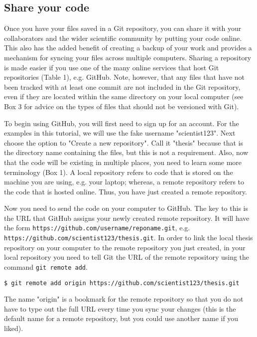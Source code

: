 \subsection{Share your code}

Once you have your files saved in a Git repository, you can share it with your collaborators and the wider scientific community by putting your code online.
This also has the added benefit of creating a backup of your work and provides a mechanism for syncing your files across multiple computers.
Sharing a repository is made easier if you use one of the many online services that host Git repositories (Table 1), e.g. GitHub.
Note, however, that any files that have not been tracked with at least one commit are not included in the Git repository, even if they are located within the same directory on your local computer (see Box 3 for advice on the types of files that should not be versioned with Git).

To begin using GitHub, you will first need to sign up for an account.
For the examples in this tutorial, we will use the fake username "scientist123".
Next choose the option to "Create a new repository".
Call it "thesis" because that is the directory name containing the files, but this is not a requirement.
Also, now that the code will be existing in multiple places, you need to learn some more terminology (Box 1).
A local repository refers to code that is stored on the machine you are using, e.g. your laptop; whereas, a remote repository refers to the code that is hosted online.
Thus, you have just created a remote repository.

Now you need to send the code on your computer to GitHub.
The key to this is the URL that GitHub assigns your newly created remote repository.
It will have the form \verb|https://github.com/username/reponame.git|, e.g. \verb|https://github.com/scientist123/thesis.git|.
In order to link the local thesis repository on your computer to the remote repository you just created, in your local repository you need to tell Git the URL of the remote repository using the command \verb|git remote add|.

\begin{lstlisting}
$ git remote add origin https://github.com/scientist123/thesis.git
\end{lstlisting}

The name "origin" is a bookmark for the remote repository so that you do not have to type out the full URL every time you sync your changes (this is the default name for a remote repository, but you could use another name if you liked).

